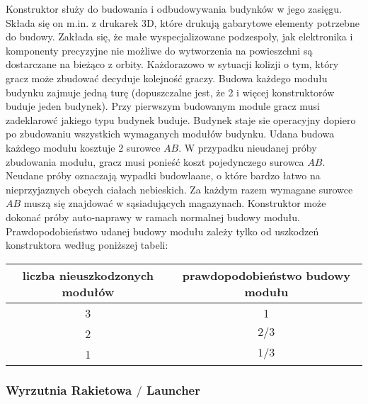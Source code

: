 \documentclass[11pt,a4paper]{article}
\begin{document}
Konstruktor służy do budowania i odbudowywania budynków w jego zasięgu. Składa się on m.in. z drukarek 3D, które drukują gabarytowe elementy potrzebne do budowy. Zakłada się, że małe wyspecjalizowane podzespoły, jak elektronika i komponenty precyzyjne nie możliwe do wytworzenia na powieszchni są dostarczane na bieżąco z orbity. Każdorazowo w sytuacji kolizji o tym, który gracz może zbudować decyduje kolejność graczy. Budowa każdego modułu budynku zajmuje jedną turę (dopuszczalne jest, że 2 i więcej konstruktorów buduje jeden budynek). Przy pierwszym budowanym module gracz musi zadeklarowć jakiego typu budynek buduje. Budynek staje sie operacyjny dopiero po zbudowaniu wszystkich wymaganych modułów budynku. Udana budowa każdego modułu kosztuje 2 surowce $AB$. W przypadku nieudanej próby zbudowania modułu, gracz musi ponieść koszt pojedynczego surowca $AB$. Neudane próby oznaczają wypadki budowlaane, o które bardzo łatwo na nieprzyjaznych obcych ciałach nebieskich. Za każdym razem wymagane surowce $AB$ muszą się znajdować w sąsiadujących magazynach. Konstruktor może dokonać próby auto-naprawy w ramach normalnej budowy modułu. Prawdopodobieństwo udanej budowy modułu zależy tylko od uszkodzeń konstruktora według poniższej tabeli:
\begin{center}
  \begin{tabular}{| c | c |}
    \hline
    \textbf{liczba nieuszkodzonych modułów} & \textbf{prawdopodobieństwo budowy modułu}\\
    \hline
     3 & 1 \\
    \hline
    2 & $2/3$ \\
    \hline
    1 & $1/3$ \\
    \hline
  \end{tabular}
\end{center}

\subsubsection{Wyrzutnia Rakietowa $/$ Launcher}
\end{document}
